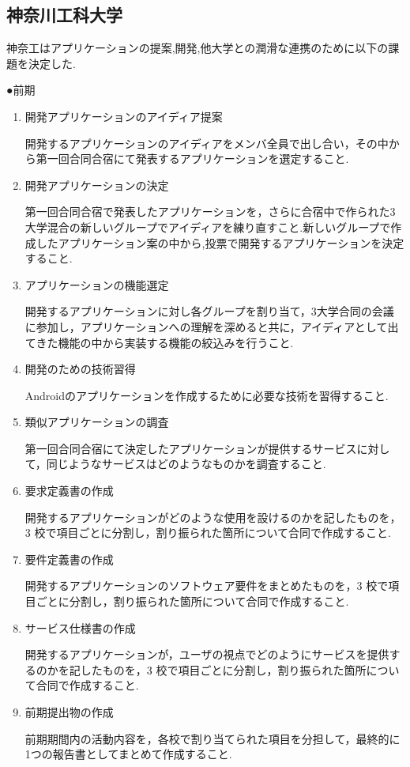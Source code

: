 \subsection{神奈川工科大学}
神奈工はアプリケーションの提案,開発,他大学との潤滑な連携のために以下の課題を決定した.
\par●前期
\begin{enumerate}
\item 開発アプリケーションのアイディア提案
\par 開発するアプリケーションのアイディアをメンバ全員で出し合い，その中から第一回合同合宿にて発表するアプリケーションを選定すること.
\item 開発アプリケーションの決定
\par 第一回合同合宿で発表したアプリケーションを，さらに合宿中で作られた3大学混合の新しいグループでアイディアを練り直すこと.新しいグループで作成したアプリケーション案の中から,投票で開発するアプリケーションを決定すること.
\item アプリケーションの機能選定
\par 開発するアプリケーションに対し各グループを割り当て，3大学合同の会議に参加し，アプリケーションへの理解を深めると共に，アイディアとして出てきた機能の中から実装する機能の絞込みを行うこと.
\item 開発のための技術習得
\par Androidのアプリケーションを作成するために必要な技術を習得すること.
\item 類似アプリケーションの調査
\par 第一回合同合宿にて決定したアプリケーションが提供するサービスに対して，同じようなサービスはどのようなものかを調査すること.
\item 要求定義書の作成
\par 開発するアプリケーションがどのような使用を設けるのかを記したものを，3 校で項目ごとに分割し，割り振られた箇所について合同で作成すること.
\item 要件定義書の作成
\par 開発するアプリケーションのソフトウェア要件をまとめたものを，3 校で項目ごとに分割し，割り振られた箇所について合同で作成すること.
\item サービス仕様書の作成
\par 開発するアプリケーションが，ユーザの視点でどのようにサービスを提供するのかを記したものを，3 校で項目ごとに分割し，割り振られた箇所について合同で作成すること.
\item 前期提出物の作成
\par 前期期間内の活動内容を，各校で割り当てられた項目を分担して，最終的に1つの報告書としてまとめて作成すること.
\end{enumerate}

